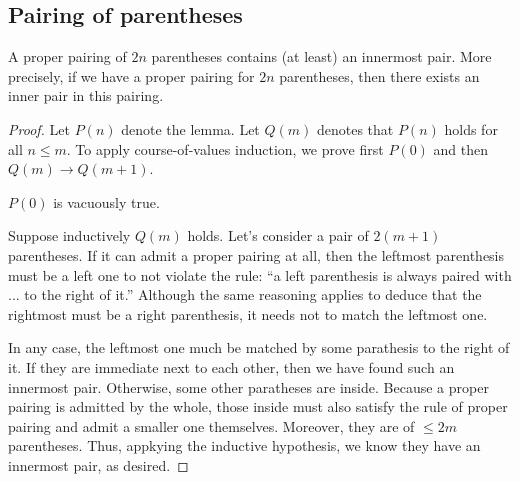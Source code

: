 \subsection{Pairing of parentheses}
\begin{lem} \label{lem.pairing.1}
A proper pairing of $2n$ parentheses contains (at least) an innermost pair. More
precisely, if we have a proper pairing for $2n$ parentheses, then there exists
an inner pair in this pairing.
\end{lem}
\begin{proof}
Let $P(n)$ denote the lemma. Let $Q(m)$ denotes that $P(n)$ holds for all $n
\le m$. To apply course-of-values induction, we prove first $P(0)$ and then
$Q(m) \to Q(m+1)$.

$P(0)$ is vacuously true.

Suppose inductively $Q(m)$ holds. Let's consider a pair of $2(m+1)$
parentheses. If it can admit a proper pairing at all, then the leftmost
parenthesis must be a left one to not violate the rule: ``a left parenthesis is
always paired with ... to the right of it.'' Although the same reasoning
applies to deduce that the rightmost must be a right parenthesis, it needs not
to match the leftmost one. 

In any case, the leftmost one much be matched by some parathesis to the right
of it. If they are immediate next to each other, then we have found such an
innermost pair. Otherwise, some other paratheses are inside. Because a proper
pairing is admitted by the whole, those inside must also satisfy the rule of
proper pairing and admit a smaller one themselves. Moreover, they are of $\le
2m$ parentheses. Thus, appkying the inductive hypothesis, we know they have an
innermost pair, as desired.
\end{proof}

